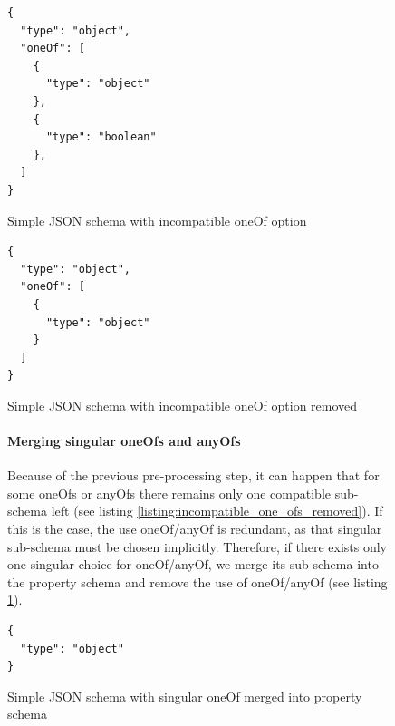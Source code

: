 \begin{figure}[h]
\begin{listing}[!h]
    \begin{verbatim}
{
  "type": "object",
  "oneOf": [
    {
      "type": "object"
    },
    {
      "type": "boolean"
    },
  ]
}
    \end{verbatim}
    \caption{Simple JSON schema with incompatible oneOf option}
    \label{listing:incompatible_one_ofs}

\end{listing}


\begin{listing}[!h]
    \begin{verbatim}
{
  "type": "object",
  "oneOf": [
    {
      "type": "object"
    }
  ]
}
    \end{verbatim}
    \caption{Simple JSON schema with incompatible oneOf option removed}
    \label{listing:incompatible_one_ofs_removed}
\end{listing}


\paragraph{Merging singular oneOfs and anyOfs}
Because of the previous pre-processing step, it can happen that for some oneOfs or anyOfs there remains only one compatible sub-schema left (see listing \ref{listing:incompatible_one_ofs_removed}).
If this is the case, the use oneOf/anyOf is redundant, as that singular sub-schema must be chosen implicitly.
Therefore, if there exists only one singular choice for oneOf/anyOf, we merge its sub-schema into the property schema and remove the use of oneOf/anyOf (see listing \ref{listing:singular_one_of_merged}).

\begin{listing}[!h]
    \begin{verbatim}
{
  "type": "object"
}
    \end{verbatim}
    \caption{Simple JSON schema with singular oneOf merged into property schema}
    \label{listing:singular_one_of_merged}
\end{listing}



\end{figure}

